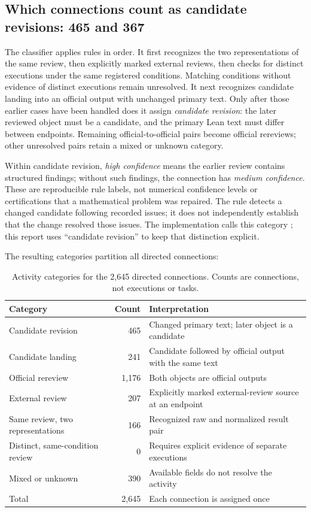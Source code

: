 \subsection{Which connections count as candidate revisions: 465 and 367}
\label{subsec:revision-rule}
The classifier applies rules in order. It first recognizes the two representations of the same review, then explicitly marked external reviews, then checks for distinct executions under the same registered conditions. Matching conditions without evidence of distinct executions remain unresolved. It next recognizes candidate landing into an official output with unchanged primary text. Only after those earlier cases have been handled does it assign \emph{candidate revision}: the later reviewed object must be a candidate, and the primary Lean text must differ between endpoints. Remaining official-to-official pairs become official rereviews; other unresolved pairs retain a mixed or unknown category.

Within candidate revision, \emph{high confidence} means the earlier review contains structured findings; without such findings, the connection has \emph{medium confidence}. These are reproducible rule labels, not numerical confidence levels or certifications that a mathematical problem was repaired. The rule detects a changed candidate following recorded issues; it does not independently establish that the change resolved those issues. The implementation calls this category ; this report uses ``candidate revision'' to keep that distinction explicit.

The resulting categories partition all directed connections:
\begin{table}[htbp]
\centering\small
\caption{Activity categories for the 2,645 directed connections. Counts are connections, not executions or tasks.}
\label{tab:roles}
\begin{tabularx}{\linewidth}{Y r Y}
\toprule
Category & Count & Interpretation \\
\midrule
Candidate revision & 465 & Changed primary text; later object is a candidate \\
Candidate landing & 241 & Candidate followed by official output with the same text \\
Official rereview & 1,176 & Both objects are official outputs \\
External review & 207 & Explicitly marked external-review source at an endpoint \\
Same review, two representations & 166 & Recognized raw and normalized result pair \\
Distinct, same-condition review & 0 & Requires explicit evidence of separate executions \\
Mixed or unknown & 390 & Available fields do not resolve the activity \\
\midrule
Total & 2,645 & Each connection is assigned once \\
\bottomrule
\end{tabularx}
\end{table}

